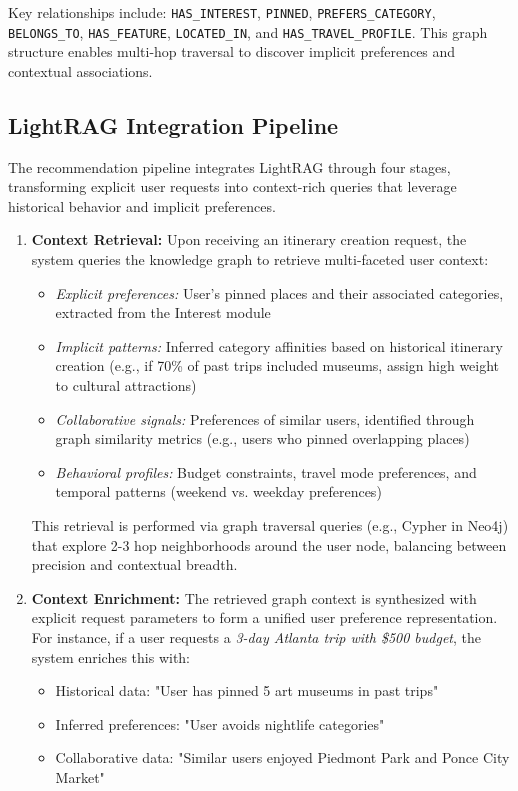 \documentclass{article} %
\begin{document}
Key relationships include: \texttt{HAS\_INTEREST}, \texttt{PINNED}, \texttt{PREFERS\_CATEGORY}, \texttt{BELONGS\_TO}, \texttt{HAS\_FEATURE}, \texttt{LOCATED\_IN}, and \texttt{HAS\_TRAVEL\_PROFILE}. This graph structure enables multi-hop traversal to discover implicit preferences and contextual associations.

\subsection{LightRAG Integration Pipeline}

The recommendation pipeline integrates LightRAG through four stages, transforming explicit user requests into context-rich queries that leverage historical behavior and implicit preferences.

\begin{enumerate}
    \item \textbf{Context Retrieval:} Upon receiving an itinerary creation request, the system queries the knowledge graph to retrieve multi-faceted user context:
    \begin{itemize}
        \item \textit{Explicit preferences:} User's pinned places and their associated categories, extracted from the Interest module
        \item \textit{Implicit patterns:} Inferred category affinities based on historical itinerary creation (e.g., if 70\% of past trips included museums, assign high weight to cultural attractions)
        \item \textit{Collaborative signals:} Preferences of similar users, identified through graph similarity metrics (e.g., users who pinned overlapping places)
        \item \textit{Behavioral profiles:} Budget constraints, travel mode preferences, and temporal patterns (weekend vs. weekday preferences)
    \end{itemize}

    This retrieval is performed via graph traversal queries (e.g., Cypher in Neo4j) that explore 2-3 hop neighborhoods around the user node, balancing between precision and contextual breadth.

    \item \textbf{Context Enrichment:} The retrieved graph context is synthesized with explicit request parameters to form a unified user preference representation. For instance, if a user requests a \textit{3-day Atlanta trip with \$500 budget}, the system enriches this with:
    \begin{itemize}
        \item Historical data: "User has pinned 5 art museums in past trips"
        \item Inferred preferences: "User avoids nightlife categories"
        \item Collaborative data: "Similar users enjoyed Piedmont Park and Ponce City Market"
    \end{itemize}


\end{enumerate}
\end{document}
